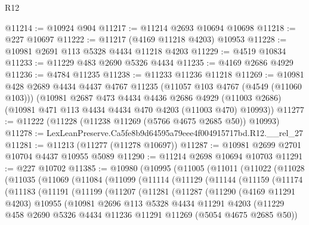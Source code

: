\begin{lexlean}{R12}
\begin{coremodule}
@11214 := @10924 @904
@11217 := @11214 @2693 @10694 @10698
@11218 := @227 @10697
@11222 := @11217 (@4169 @11218 @4203) @10953
@11228 := @10981 @2691 @113 @5328 @4434 @11218 @4203
@11229 := @4519 @10834
@11233 := @11229 @483 @2690 @5326 @4434
@11235 := @4169 @2686 @4929
@11236 := @4784 @11235
@11238 := @11233 @11236 @11218
@11269 := @10981
    @428
    @2689
    @4434
    @4437
    @4767
    @11235
    (@11057 @103 @4767 (@4549 (@11060 @103)))
    (@10981
      @2687
      @473
      @4434
      @4436
      @2686
      @4929
      (@11003 @2686)
      (@10981 @471 @113 @4434 @4434 @470 @4203 (@11003 @470) @10993))
@11277 := @11222 (@11228 (@11238 @11269 (@5766 @4675 @2685 @50)) @10993)
@11278 := LexLeanPreserve.Ca5fe8b9d64595a79eee4f004915717bd.R12.__rel_27
@11281 := @11213 (@11277 (@11278 @10697))
@11287 := @10981 @2699 @2701 @10704 @4437 @10955 @5089
@11290 := @11214 @2698 @10694 @10703
@11291 := @227 @10702
@11385 := @10980
    (@10995
      (@11005
        (@11011
          (@11022
            (@11028
              (@11035
                (@11069
                  (@11084
                    (@11099
                      (@11114
                        (@11129
                          (@11144
                            (@11159
                              (@11174
                                (@11183
                                  (@11191
                                    (@11199
                                      (@11207
                                        (@11281
                                          (@11287
                                            (@11290
                                              (@4169 @11291 @4203)
                                              @10955
                                              (@10981
                                                @2696
                                                @113
                                                @5328
                                                @4434
                                                @11291
                                                @4203
                                                (@11229
                                                  @458
                                                  @2690
                                                  @5326
                                                  @4434
                                                  @11236
                                                  @11291
                                                  @11269
                                                  (@5054 @4675 @2685 @50))

\end{coremodule}
\end{lexlean}
